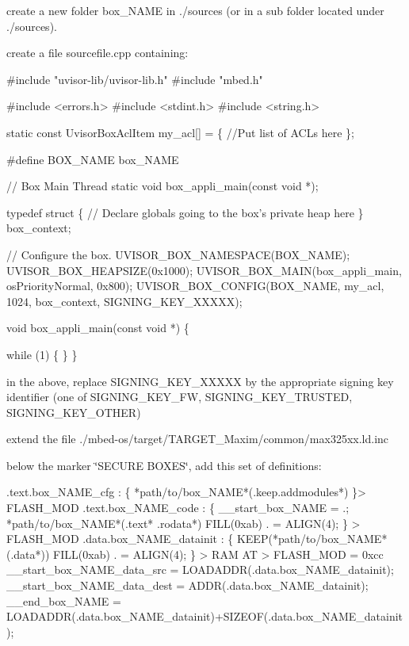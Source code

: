 \begin{DoxyEnumerate}
\item create a new folder box\+\_\+\+N\+A\+ME in ./sources (or in a sub folder located under ./sources).
\item create a file sourcefile.\+cpp containing\+: 
\begin{DoxyCode}
\textcolor{preprocessor}{  #include "uvisor-lib/uvisor-lib.h"}
\textcolor{preprocessor}{  #include "mbed.h"}

\textcolor{preprocessor}{  #include <errors.h>}
\textcolor{preprocessor}{  #include <stdint.h>}
\textcolor{preprocessor}{  #include <string.h>}

  \textcolor{keyword}{static} \textcolor{keyword}{const} UvisorBoxAclItem my\_acl[] = \{
   \textcolor{comment}{//Put list of ACLs here}
  \};

\textcolor{preprocessor}{#define BOX\_NAME box\_NAME}

\textcolor{comment}{// Box Main Thread}
\textcolor{keyword}{static} \textcolor{keywordtype}{void} box\_appli\_main(\textcolor{keyword}{const} \textcolor{keywordtype}{void} *);

\textcolor{keyword}{typedef} \textcolor{keyword}{struct }\{
  \textcolor{comment}{// Declare globals going to the box's private heap here}
\} box\_context;

\textcolor{comment}{// Configure the  box.}
UVISOR\_BOX\_NAMESPACE(BOX\_NAME);
UVISOR\_BOX\_HEAPSIZE(0x1000);
UVISOR\_BOX\_MAIN(box\_appli\_main, osPriorityNormal, 0x800);
UVISOR\_BOX\_CONFIG(BOX\_NAME, my\_acl, 1024, box\_context, SIGNING\_KEY\_XXXXX);

\textcolor{keywordtype}{void} box\_appli\_main(\textcolor{keyword}{const} \textcolor{keywordtype}{void} *) \{

  \textcolor{keywordflow}{while} (1) \{
  \}
\}
\end{DoxyCode}

\item in the above, replace S\+I\+G\+N\+I\+N\+G\+\_\+\+K\+E\+Y\+\_\+\+X\+X\+X\+XX by the appropriate signing key identifier (one of S\+I\+G\+N\+I\+N\+G\+\_\+\+K\+E\+Y\+\_\+\+FW, S\+I\+G\+N\+I\+N\+G\+\_\+\+K\+E\+Y\+\_\+\+T\+R\+U\+S\+T\+ED, S\+I\+G\+N\+I\+N\+G\+\_\+\+K\+E\+Y\+\_\+\+O\+T\+H\+ER)
\item extend the file ./mbed-\/os/target/\+T\+A\+R\+G\+E\+T\+\_\+\+Maxim/common/max325xx.ld.\+inc
\item below the marker \char`\"{}\+S\+E\+C\+U\+R\+E B\+O\+X\+E\+S\char`\"{}, add this set of definitions\+: 
\begin{DoxyCode}
.text.box\_NAME\_cfg :
 \{
   *path/to/box\_NAME*(.keep.addmodules*)
 \}> FLASH\_MOD
 .text.box\_NAME\_code :
 \{
   \_\_start\_box\_NAME = .;
   *path/to/box\_NAME*(.text* .rodata*)
   FILL(0xab)
   . = ALIGN(4);
 \} > FLASH\_MOD
 .data.box\_NAME\_datainit :
 \{
     KEEP(*path/to/box\_NAME*(.data*))
     FILL(0xab)
     . = ALIGN(4);
 \} > RAM  AT > FLASH\_MOD = 0xcc
 \_\_start\_box\_NAME\_data\_src  = LOADADDR(.data.box\_NAME\_datainit);
 \_\_start\_box\_NAME\_data\_dest = ADDR(.data.box\_NAME\_datainit);
 \_\_end\_box\_NAME             = LOADADDR(.data.box\_NAME\_datainit)+SIZEOF(.data.box\_NAME\_datainit);
\end{DoxyCode}


\end{DoxyEnumerate}
